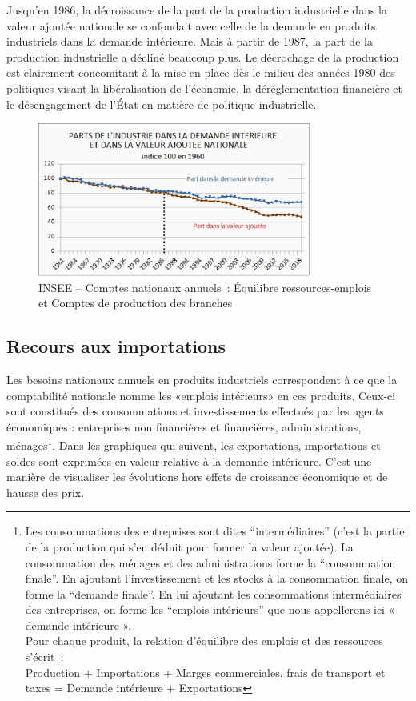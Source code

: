 \documentclass[a4paper]{article}
\begin{document}
Jusqu’en 1986, la décroissance de la part de la production industrielle dans la  valeur ajoutée nationale se confondait avec celle de la demande en produits industriels dans la demande intérieure. Mais à partir de 1987, la part de la production industrielle a décliné beaucoup plus. 
Le décrochage de la production est clairement concomitant à la mise en place dès le milieu des années 1980 des politiques  visant la libéralisation de l’économie, la déréglementation financière et le désengagement de l’État en matière de politique industrielle.

\begin{figure}[H]
\centering
\includegraphics*[width=0.8\textwidth]{images/part-industrie}
\caption{INSEE – Comptes nationaux annuels~: Équilibre ressources-emplois et Comptes de production des branches}
\label{fig:part-industrie}
\end{figure}

\subsection{Recours aux importations}
Les besoins nationaux annuels en produits industriels correspondent à ce que la comptabilité nationale nomme les «emplois intérieurs» en ces produits. Ceux-ci sont constitués des consommations et investissements effectués par les agents économiques : entreprises non financières et financières, administrations, ménages\footnote{Les consommations des entreprises sont dites “intermédiaires” (c’est la partie de la production qui s’en déduit pour former la valeur ajoutée). La consommation des ménages et des administrations forme la “consommation finale”. En ajoutant l’investissement et les stocks à la consommation finale, on forme la “demande finale”. En lui ajoutant les consommations intermédiaires des entreprises, on forme les “emplois intérieurs” que nous appellerons ici  « demande intérieure ».\\
Pour chaque produit, la relation d’équilibre des emplois et des ressources s’écrit~:\\
Production + Importations + Marges commerciales, frais de transport et taxes = Demande intérieure + Exportations}. Dans les graphiques qui suivent, les exportations, importations et soldes sont exprimées en valeur relative à la demande intérieure. C’est une manière de visualiser les évolutions hors effets de croissance économique et de hausse des prix.
\end{document}
